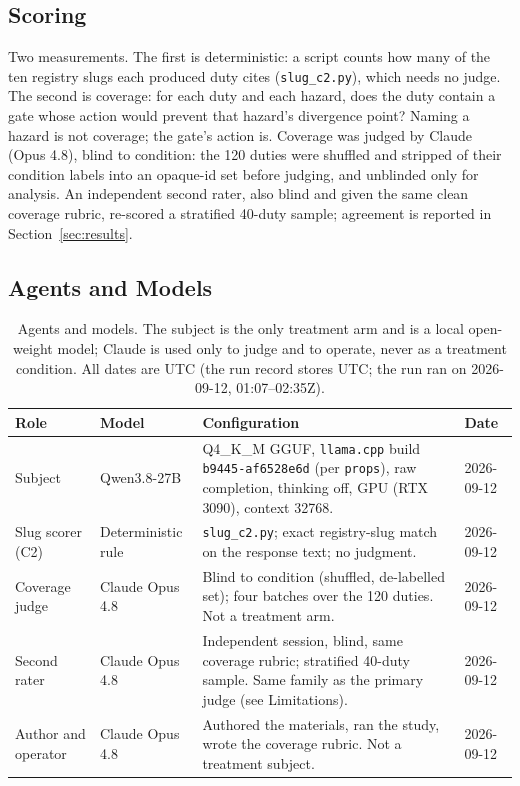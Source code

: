 \documentclass[11pt,a4paper]{article}
\begin{document}
\subsection{Scoring}

Two measurements. The first is deterministic: a script counts how many of the
ten registry slugs each produced duty cites (\texttt{slug\_c2.py}), which needs
no judge. The second is coverage: for each duty and each hazard, does the duty
contain a gate whose action would prevent that hazard's divergence point? Naming
a hazard is not coverage; the gate's action is. Coverage was judged by Claude
(Opus 4.8), blind to condition: the 120 duties were shuffled and stripped of
their condition labels into an opaque-id set before judging, and unblinded only
for analysis. An independent second rater, also blind and given the same clean coverage
rubric, re-scored a stratified 40-duty sample; agreement is
reported in Section~\ref{sec:results}.

\subsection{Agents and Models}\label{sec:agents}

\begin{table}[h]
\centering
\small
\begin{tabular}{p{3.1cm} p{3.0cm} p{6.2cm} l}
\toprule
\textbf{Role} & \textbf{Model} & \textbf{Configuration} & \textbf{Date} \\
\midrule
Subject & Qwen3.8-27B & Q4\_K\_M GGUF, \texttt{llama.cpp} build \texttt{b9445-af6528e6d} (per \texttt{props}), raw completion, thinking off, GPU (RTX 3090), context 32768. & 2026-09-12 \\
Slug scorer (C2) & Deterministic rule & \texttt{slug\_c2.py}; exact registry-slug match on the response text; no judgment. & 2026-09-12 \\
Coverage judge & Claude Opus 4.8 & Blind to condition (shuffled, de-labelled set); four batches over the 120 duties. Not a treatment arm. & 2026-09-12 \\
Second rater & Claude Opus 4.8 & Independent session, blind, same coverage rubric; stratified 40-duty sample. Same family as the primary judge (see Limitations). & 2026-09-12 \\
Author and operator & Claude Opus 4.8 & Authored the materials, ran the study, wrote the coverage rubric. Not a treatment subject. & 2026-09-12 \\
\bottomrule
\end{tabular}
\caption{Agents and models. The subject is the only treatment arm and is a
local open-weight model; Claude is used only to judge and to operate, never as
a treatment condition. All dates are UTC (the run record stores UTC; the run
ran on 2026-09-12, 01:07--02:35Z).}
\end{table}
\end{document}
